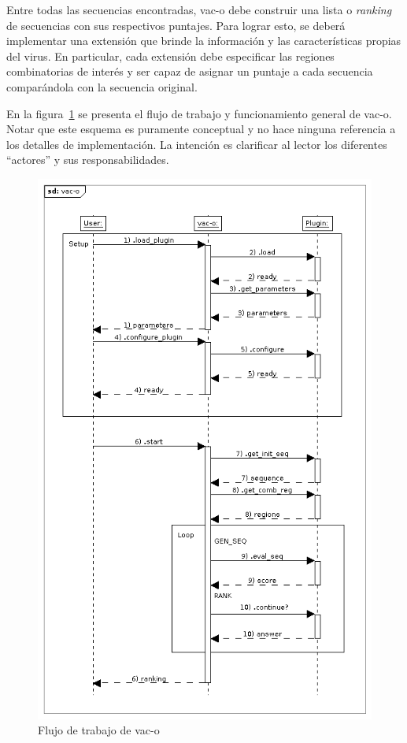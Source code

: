 \documentclass[10pt,a4paper]{article}
\begin{document}
    Entre todas las secuencias encontradas, vac-o debe construir una lista o \textit{ranking} de secuencias con sus respectivos puntajes. Para lograr esto, se deber\'a implementar una extensi\'on que brinde la informaci\'on y las caracter\'isticas propias del virus. En particular, cada extensi\'on debe especificar las regiones combinatorias de inter\'es y ser capaz de asignar un puntaje a cada secuencia compar\'andola con la secuencia original. 

    En la figura~\ref{fig:1} se presenta el flujo de trabajo y funcionamiento general de vac-o. Notar que este esquema es puramente conceptual y no hace ninguna referencia a los detalles de implementaci\'on. La intenci\'on es clarificar al lector los diferentes ``actores'' y sus responsabilidades.
    \begin{figure}
	    \centering
	    \includegraphics[scale=0.65]{seq-diagram.png}
	    \caption{Flujo de trabajo de vac-o}
	    \label{fig:1}
    \end{figure}
\end{document}
